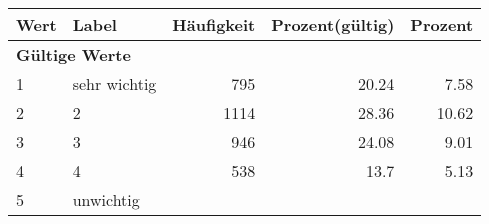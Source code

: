      \begin{longtable}{lXrrr}
     \toprule
     \textbf{Wert} & \textbf{Label} & \textbf{Häufigkeit} & \textbf{Prozent(gültig)} & \textbf{Prozent} \\
     \endhead
     \midrule
     \multicolumn{5}{l}{\textbf{Gültige Werte}}\\

     1 &
     \multicolumn{1}{X}{ sehr wichtig   } &


       \num{795} &
       \num[round-mode=places,round-precision=2]{20,24} &
         \num[round-mode=places,round-precision=2]{7,58} \\

     2 &
     \multicolumn{1}{X}{ 2   } &


       \num{1114} &
       \num[round-mode=places,round-precision=2]{28,36} &
         \num[round-mode=places,round-precision=2]{10,62} \\

     3 &
     \multicolumn{1}{X}{ 3   } &


       \num{946} &
       \num[round-mode=places,round-precision=2]{24,08} &
         \num[round-mode=places,round-precision=2]{9,01} \\

     4 &
     \multicolumn{1}{X}{ 4   } &


       \num{538} &
       \num[round-mode=places,round-precision=2]{13,7} &
         \num[round-mode=places,round-precision=2]{5,13} \\

     5 &
     \multicolumn{1}{X}{ unwichtig   } &



\end{longtable}
